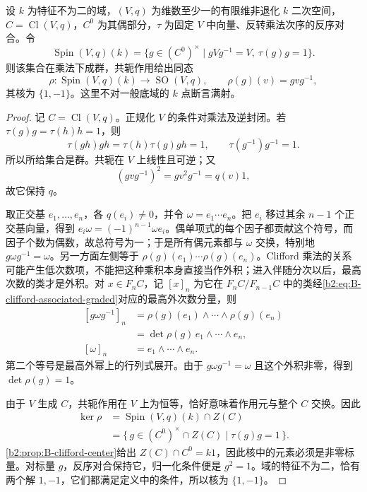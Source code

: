 \begin{proposition}\label{b2:prop:B-spin-action}
	设 \(k\) 为特征不为二的域，\((V,q)\) 为维数至少一的有限维非退化 \(k\) 二次空间，\(C=\operatorname{Cl}(V,q)\)，\(C^0\) 为其偶部分，\(\tau\) 为固定 \(V\) 中向量、反转乘法次序的反序对合。令
	\[
		\operatorname{Spin}(V,q)(k)
		=\{g\in(C^0)^\times\mid gVg^{-1}=V,\ \tau(g)g=1\}.
	\]
	则该集合在乘法下成群，共轭作用给出同态
	\[
		\rho:\operatorname{Spin}(V,q)(k)\longrightarrow\operatorname{SO}(V,q), \qquad \rho(g)(v)=gvg^{-1},
	\]
	其核为 \(\{1,-1\}\)。这里不对一般底域的 \(k\) 点断言满射。
\end{proposition}
\begin{proof}
	记 \(C=\operatorname{Cl}(V,q)\)。正规化 \(V\) 的条件对乘法及逆封闭。若 \(\tau(g)g=\tau(h)h=1\)，则
	\[
		\tau(gh)gh=\tau(h)\tau(g)gh=1, \qquad \tau(g^{-1})g^{-1}=1.
	\]
	所以所给集合是群。共轭在 \(V\) 上线性且可逆；又
	\[
		(gvg^{-1})^2=gv^2g^{-1}=q(v)1,
	\]
	故它保持 \(q\)。

	取正交基 \(e_1,\ldots,e_n\)，各 \(q(e_i)\ne0\)，并令 \(\omega=e_1\cdots e_n\)。把 \(e_i\) 移过其余 \(n-1\) 个正交基向量，得到 \(e_i\omega=(-1)^{n-1}\omega e_i\)。偶单项式的每个因子都贡献这个符号，而因子个数为偶数，故总符号为一；于是所有偶元素都与 \(\omega\) 交换，特别地 \(g\omega g^{-1}=\omega\)。另一方面左侧等于 \(\rho(g)(e_1)\cdots\rho(g)(e_n)\)。Clifford 乘法的关系可能产生低次数项，不能把这种乘积本身直接当作外积；进入伴随分次以后，最高次数的类才是外积。对 \(x\in F_nC\)，记 \([x]_n\) 为它在 \(F_nC/F_{n-1}C\) 中的类经\eqref{b2:eq:B-clifford-associated-graded}对应的最高外次数分量，则
	\[
		\begin{aligned}
			[g\omega g^{-1}]_n &=\rho(g)(e_1)\wedge\cdots\wedge\rho(g)(e_n)\\
			&=\det\rho(g)\,e_1\wedge\cdots\wedge e_n,\\
			[\omega]_n&=e_1\wedge\cdots\wedge e_n.
		\end{aligned}
	\]
	第二个等号是最高外幂上的行列式展开。由于 \(g\omega g^{-1}=\omega\) 且这个外积非零，得到 \(\det\rho(g)=1\)。

	由于 \(V\) 生成 \(C\)，共轭作用在 \(V\) 上为恒等，恰好意味着作用元与整个 \(C\) 交换。因此
	\[
		\begin{aligned}
			\ker\rho &=\operatorname{Spin}(V,q)(k)\cap Z(C)\\
			&=\{\,g\in(C^0)^\times\cap Z(C)\mid\tau(g)g=1\,\}.
		\end{aligned}
	\]
	\cref{b2:prop:B-clifford-center}给出 \(Z(C)\cap C^0=k1\)，因此核中的元素必须是非零标量。对标量 \(g\)，反序对合保持它，归一化条件便是 \(g^2=1\)。域的特征不为二，恰有两个解 \(1,-1\)，它们都满足定义中的条件，所以核为 \(\{1,-1\}\)。
\end{proof}

